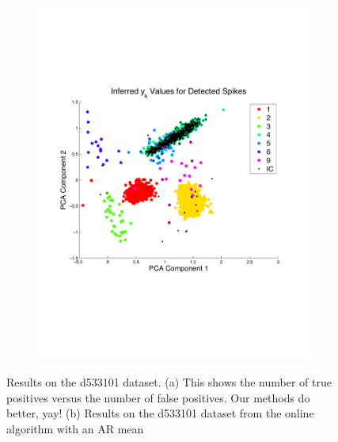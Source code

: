 \begin{center}
\begin{figure}
\begin{subfigure}[b]{.5\textwidth}
\includegraphics[width=\textwidth]{../figs/ykarreduced}
\caption{}
\label{pcaonlinear}
\end{subfigure}
\caption{Results on the d533101 dataset.  (a) This shows the number of true positives versus the number of false positives.  Our methods do better, yay! (b) Results on the d533101 dataset from the online algorithm with an AR mean}
\end{figure}
\end{center}

